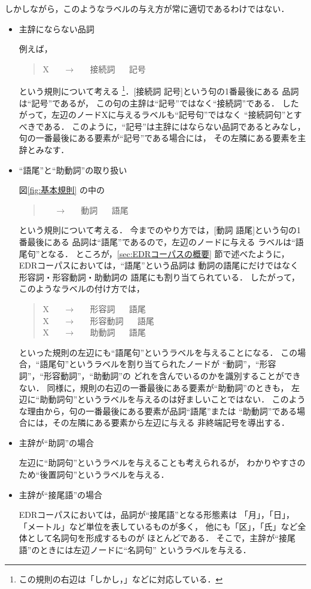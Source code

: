 しかしながら，このようなラベルの与え方が常に適切であるわけではない．
\begin{itemize}
\item 主辞にならない品詞

  \quad 例えば，
  \begin{quote}
    X ~~ $\rightarrow$ ~~ 接続詞 ~~ 記号
  \end{quote}
  という規則について考える
  \footnote{
    この規則の右辺は「しかし，」などに対応している．
    }．[接続詞 記号]という句の1番最後にある
  品詞は``記号''であるが，
  この句の主辞は``記号''ではなく``接続詞''である．
  したがって，左辺のノードXに与えるラベルも``記号句''ではなく
  ``接続詞句''とすべきである．
  このように，``記号''は主辞にはならない品詞であるとみなし，
  句の一番最後にある要素が``記号''である場合には，
  その左隣にある要素を主辞とみなす．

\item ``語尾''と``助動詞''の取り扱い

  \quad 図\ref{fig:基本規則} の中の
  \begin{quote}
     ~~ $\rightarrow$ ~~ 動詞 ~~ 語尾
  \end{quote}
  という規則について考える．
  今までのやり方では，[動詞 語尾]という句の1番最後にある
  品詞は``語尾''であるので，左辺のノードに与える
  ラベルは``語尾句''となる．
  ところが，\ref{sec:EDRコーパスの概要} 節で述べたように，
  EDRコーパスにおいては，``語尾''という品詞は
  動詞の語尾にだけではなく形容詞・形容動詞・助動詞の
  語尾にも割り当てられている．
  したがって，このようなラベルの付け方では，
  \begin{quote}
    X ~~ $\rightarrow$ ~~ 形容詞 ~~ 語尾   \\
    X ~~ $\rightarrow$ ~~ 形容動詞 ~~ 語尾 \\
    X ~~ $\rightarrow$ ~~ 助動詞 ~~ 語尾
  \end{quote}
  といった規則の左辺にも``語尾句''というラベルを与えることになる．
  この場合，``語尾句''というラベルを割り当てられたノードが
  ``動詞''，``形容詞''，``形容動詞''，``助動詞''の
  どれを含んでいるのかを識別することができない．
  同様に，規則の右辺の一番最後にある要素が``助動詞''のときも，
  左辺に``助動詞句''というラベルを与えるのは好ましいことではない．
  このような理由から，句の一番最後にある要素が品詞``語尾''または
  ``助動詞''である場合には，その左隣にある要素から左辺に与える
  非終端記号を導出する．

\item 主辞が``助詞''の場合
  
  \quad 左辺に``助詞句''というラベルを与えることも考えられるが，
  わかりやすさのため``後置詞句''というラベルを与える．

\item 主辞が``接尾語''の場合

  \quad EDRコーパスにおいては，品詞が``接尾語''となる形態素は
  「月」，「日」，「メートル」など単位を表しているものが多く，
  他にも「区」，「氏」など全体として名詞句を形成するものが
  ほとんどである．
  そこで，主辞が``接尾語''のときには左辺ノードに``名詞句''
  というラベルを与える．
\end{itemize}

